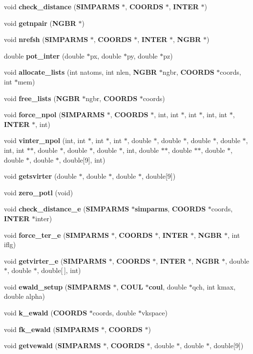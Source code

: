 \begin{CompactItemize}
\item 
void {\bf check\_\-distance} ({\bf SIMPARMS} $\ast$, {\bf COORDS} $\ast$, {\bf INTER} $\ast$)
\item 
void {\bf getnpair} ({\bf NGBR} $\ast$)
\item 
void {\bf nrefsh} ({\bf SIMPARMS} $\ast$, {\bf COORDS} $\ast$, {\bf INTER} $\ast$, {\bf NGBR} $\ast$)
\item 
double {\bf pot\_\-inter} (double $\ast$px, double $\ast$py, double $\ast$pz)
\item 
void {\bf allocate\_\-lists} (int natoms, int nlen, {\bf NGBR} $\ast$ngbr, {\bf COORDS} $\ast$coords, int $\ast$mem)
\item 
void {\bf free\_\-lists} ({\bf NGBR} $\ast$ngbr, {\bf COORDS} $\ast$coords)
\item 
void {\bf force\_\-npol} ({\bf SIMPARMS} $\ast$, {\bf COORDS} $\ast$, int, int $\ast$, int $\ast$, int, int $\ast$, {\bf INTER} $\ast$, int)
\item 
void {\bf vinter\_\-npol} (int, int $\ast$, int $\ast$, int $\ast$, double $\ast$, double $\ast$, double $\ast$, double $\ast$, int, int $\ast$$\ast$, double $\ast$, double $\ast$, double $\ast$, int, double $\ast$$\ast$, double $\ast$$\ast$, double $\ast$, double $\ast$, double $\ast$, double[9], int)
\item 
void {\bf getsvirter} (double $\ast$, double $\ast$, double $\ast$, double[9])
\item 
void {\bf zero\_\-potl} (void)
\item 
void {\bf check\_\-distance\_\-e} ({\bf SIMPARMS} $\ast${\bf simparms}, {\bf COORDS} $\ast$coords, {\bf INTER} $\ast$inter)
\item 
void {\bf force\_\-ter\_\-e} ({\bf SIMPARMS} $\ast$, {\bf COORDS} $\ast$, {\bf INTER} $\ast$, {\bf NGBR} $\ast$, int iflg)
\item 
void {\bf getvirter\_\-e} ({\bf SIMPARMS} $\ast$, {\bf COORDS} $\ast$, {\bf INTER} $\ast$, {\bf NGBR} $\ast$, double $\ast$, double $\ast$, double[$\,$], int)
\item 
void {\bf ewald\_\-setup} ({\bf SIMPARMS} $\ast$, {\bf COUL} $\ast${\bf coul}, double $\ast$qch, int kmax, double alpha)
\item 
void {\bf k\_\-ewald} ({\bf COORDS} $\ast$coords, double $\ast$vkspace)
\item 
void {\bf fk\_\-ewald} ({\bf SIMPARMS} $\ast$, {\bf COORDS} $\ast$)
\item 
void {\bf getvewald} ({\bf SIMPARMS} $\ast$, {\bf COORDS} $\ast$, double $\ast$, double $\ast$, double[9])
$$
\end{CompactItemize}

